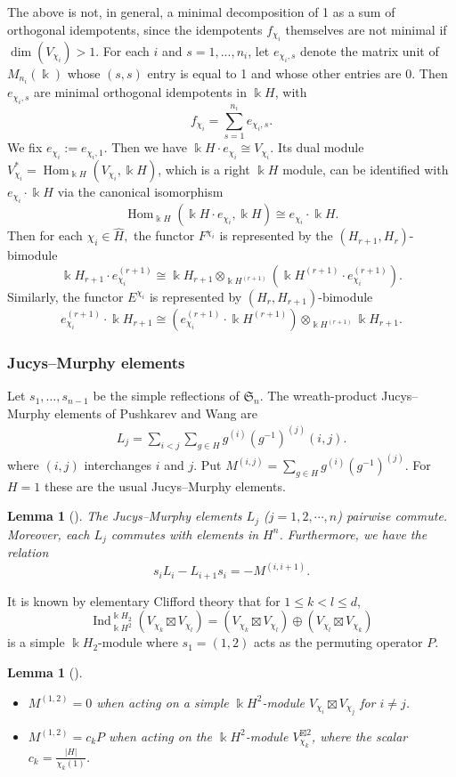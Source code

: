 \documentclass[12pt]{amsart}
\numberwithin{itemcounter}{subsection}
\theoremstyle{plain}
\newtheorem{lemma}[theorem]{Lemma}
\theoremstyle{definition}
\theoremstyle{remark}
\numberwithin{equation}{section}
\def\k{\Bbbk}
\def\Hom{\operatorname{Hom}\nolimits}
\def\Ind{\operatorname{Ind}\nolimits}
\def\Hom{\operatorname{Hom}}
\begin{document}
The above is not, in general, a minimal decomposition of 1 as a sum of orthogonal idempotents, since
the idempotents $f_{\chi_i}$ themselves are not minimal if $\dim(V_{\chi_i}) > 1$. For each $i$ and $s = 1, . . . , n_i$, let $e_{\chi_i,s}$
denote the matrix unit of $M_{n_i}(\k)$ whose $(s, s)$ entry is equal to 1 and whose other entries are 0. Then
$e_{\chi_i,s}$ are minimal orthogonal idempotents in $\k H $, with
$$f_{\chi_i} =\sum_{s=1}^{n_i}e_{\chi_i,s}.$$
We fix $e_{\chi_i}:=e_{\chi_i,1}$. Then we have $\k H \cdot e_{\chi_i}\cong V_{\chi_i}.$
Its dual module $V^*_{\chi_i}=\Hom_{\k H }(V_{\chi_i},\k H )$,  which is a right $\k H $ module, can be identified with $e_{\chi_i}\cdot \k H $ via the canonical isomorphism
$$\Hom_{\k H }(\k H  \cdot e_{\chi_i},\k H )\cong e_{\chi_i}\cdot \k H .$$
Then for each $\chi_i\in \hat H ,$
the functor $F^{\chi_i}$ is represented by the $( H _{r+1}, H _{r})$-bimodule $$\k H _{r+1}\cdot e^{(r+1)}_{\chi_i}\cong \k H _{r+1}\otimes_{ \k H ^{(r+1)}} (\k H ^{(r+1)}\cdot  e^{(r+1)}_{\chi_i}).$$
Similarly, the functor $E^{\chi_i}$ is represented by $( H _{r}, H _{r+1})$-bimodule $$e^{(r+1)}_{\chi_i}\cdot \k H _{r+1}\cong (e^{(r+1)}_{\chi_i}\cdot \k H ^{(r+1)}  )\otimes_{ \k H ^{(r+1)}}\k H _{r+1}.$$

\subsubsection{Jucys--Murphy elements}
Let $s_1,\ldots,s_{n-1}$ be the simple reflections of $\mathfrak S_n$.
The wreath-product Jucys--Murphy elements of Pushkarev \cite{Pus99} and Wang
\cite{W04a,W04b} are
\begin{align*}
	L_j=\sum\limits_{i<j}\sum_{g\in  H }g^{(i)}(g^{-1})^{(j)}(i,j).
\end{align*}
where $(i,j)$ interchanges $i$ and $j$.  Put
$M^{(i,j)}=\sum_{g\in H}g^{(i)}(g^{-1})^{(j)}$.  For $H=1$ these are the
usual Jucys--Murphy elements.
\begin{lemma}[\cite{Pus99}] The Jucys--Murphy elements $L_j$ ($j=1,2,\cdots, n$) pairwise commute. Moreover, each $L_j$ commutes with elements in  $ H ^n$. Furthermore, we have the relation
	$$s_iL_i-L_{i+1} s_i=-M^{(i,i+1)}.$$
\end{lemma}
It is known by elementary Clifford theory that
for $1 \leq k < l \leq d$, $$\Ind^{\k H _2}
_{\k H ^2}(V_{\chi_k}\boxtimes V_{\chi_l}) = (V_{\chi_k}\boxtimes V_{\chi_l})\oplus (V_{\chi_l}\boxtimes V_{\chi_k})$$ is a simple $\k H _2$-module where
$s_1=(1 ,2)$ acts as the permuting operator $P$.
\begin{lemma}[\cite{WW08}]
	\begin{itemize}\label{Lemma:ortho}

		\item[$(1)$] $M^{(1,2)} = 0$ when acting on a simple $\k H ^2$-module $V_{\chi_i}\boxtimes V_{\chi_j}$ for $i\neq j$.

		\item[$(2)$] $M^{(1,2)}= c_kP$ when acting on the $\k H ^2$-module $V_{\chi_k}^{\boxtimes 2} $, where the scalar $c_k=\frac{|H|}{\chi_k(1)}$.
	\end{itemize}
\end{lemma}
\end{document}
